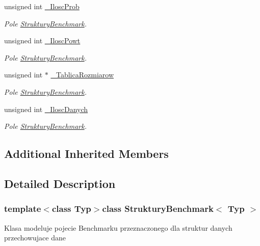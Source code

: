 \begin{DoxyCompactItemize}
unsigned int \hyperlink{class_struktury_benchmark_a5b2aee5eb235c0ad6c56a4871aad6bd3}{\-\_\-\-Ilosc\-Prob}
\begin{DoxyCompactList}\small\item\em Pole \hyperlink{class_struktury_benchmark}{Struktury\-Benchmark}. \end{DoxyCompactList}\item 
unsigned int \hyperlink{class_struktury_benchmark_a49d86123ea73ecc57bc161dcf40fba01}{\-\_\-\-Ilosc\-Powt}
\begin{DoxyCompactList}\small\item\em Pole \hyperlink{class_struktury_benchmark}{Struktury\-Benchmark}. \end{DoxyCompactList}\item 
unsigned int $\ast$ \hyperlink{class_struktury_benchmark_a9077a191d28f29d9b2eba8d4e8f72ce8}{\-\_\-\-Tablica\-Rozmiarow}
\begin{DoxyCompactList}\small\item\em Pole \hyperlink{class_struktury_benchmark}{Struktury\-Benchmark}. \end{DoxyCompactList}\item 
unsigned int \hyperlink{class_struktury_benchmark_a88384371e19a392f7d6d93a1ccadb115}{\-\_\-\-Ilosc\-Danych}
\begin{DoxyCompactList}\small\item\em Pole \hyperlink{class_struktury_benchmark}{Struktury\-Benchmark}. \end{DoxyCompactList}\end{DoxyCompactItemize}
\subsection*{Additional Inherited Members}


\subsection{Detailed Description}
\subsubsection*{template$<$class Typ$>$class Struktury\-Benchmark$<$ Typ $>$}

Klasa modeluje pojecie Benchmarku przeznaczonego dla struktur danych przechowujace dane 

